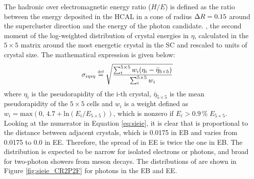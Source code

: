 The hadronic over electromagnetic energy ratio ($H/E$) is defined as the ratio between the energy deposited in the HCAL in a cone of radius $\Delta R = 0.15$
around the supercluster direction and the energy of the photon candidate.
\sieie, the second moment of the log-weighted distribution of crystal energies in $\eta$,
calculated in the $5 \times 5$ matrix around the most energetic crystal in the SC and rescaled to units of crystal size.
The mathematical expression is given below:
\begin{equation}
\label{eq:sieie}
\sigma_{i \eta i \eta} \stackrel{\text{\tiny def}}{=} \sqrt{ \frac{\sum_i^{5 \times 5} w_i(\eta_i - \bar{\eta}_{5 \times 5})}{\sum_i^{5 \times 5} w_i} }
\end{equation}
where $\eta_i$ is the pseudorapidity of the i-th crystal,
$\bar{\eta}_{5 \times 5}$ is the mean pseudorapidity of the $5 \times 5$ cells
and $w_i$ is a weight defined as $w_i = \mathrm{max}(0,\, 4.7 + \mathrm{ln}(E_i/E_{5 \times 5}))$,
which is nonzero if $E_i > 0.9\, \%\; E_{5 \times 5}$.
Looking at the numerator in Equation \ref{eq:sieie}, it is clear that \sieie is proportional to the distance between adjacent crystals,
which is 0.0175 in EB and varies from 0.0175 to 0.0 in EE.
Therefore, the spread of \sieie in EE is twice the one in EB.
The \sieie distribution is expected to be narrow for isolated electrons or photons, and broad for two-photon showers from meson decays.
The distributions of \sieie are shown in Figure \ref{fig:sieie_CR2P2F} for photons in the EB and EE.


